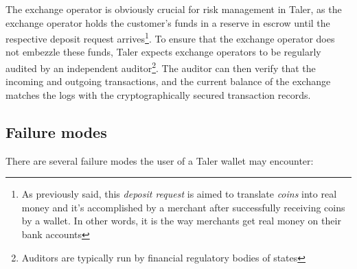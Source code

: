 \documentclass{llncs}
\begin{document}
The exchange operator is obviously crucial for risk management in
Taler, as the exchange operator holds the customer's funds in a
reserve in escrow until the respective deposit request arrives\footnote{As
previously said, this {\it deposit request} is aimed to translate {\it coins}
into real money and it's accomplished by a merchant after successfully
receiving coins by a wallet. In other words, it is the way merchants get
real money on their bank accounts}. To ensure that the exchange operator
does not embezzle these funds, Taler expects exchange operators to be
regularly audited by an independent auditor\footnote{Auditors are typically
run by financial regulatory bodies of states}.  The auditor can then verify that the incoming and outgoing
transactions, and the current balance of the exchange matches the logs
with the cryptographically secured transaction records.


\subsection{Failure modes}

There are several failure modes the user of a Taler wallet may
encounter:
\end{document}
